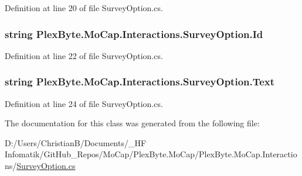 Definition at line 20 of file Survey\+Option.\+cs.

\subsubsection[{\texorpdfstring{Id}{Id}}]{\setlength{\rightskip}{0pt plus 5cm}string Plex\+Byte.\+Mo\+Cap.\+Interactions.\+Survey\+Option.\+Id\hspace{0.3cm}{\ttfamily [get]}}\hypertarget{class_plex_byte_1_1_mo_cap_1_1_interactions_1_1_survey_option_a9da80b0469096482b36fcfd126063d13}{}\label{class_plex_byte_1_1_mo_cap_1_1_interactions_1_1_survey_option_a9da80b0469096482b36fcfd126063d13}


Definition at line 22 of file Survey\+Option.\+cs.

\subsubsection[{\texorpdfstring{Text}{Text}}]{\setlength{\rightskip}{0pt plus 5cm}string Plex\+Byte.\+Mo\+Cap.\+Interactions.\+Survey\+Option.\+Text\hspace{0.3cm}{\ttfamily [get]}}\hypertarget{class_plex_byte_1_1_mo_cap_1_1_interactions_1_1_survey_option_a87cdd508f7cd9c80828c420486202bca}{}\label{class_plex_byte_1_1_mo_cap_1_1_interactions_1_1_survey_option_a87cdd508f7cd9c80828c420486202bca}


Definition at line 24 of file Survey\+Option.\+cs.



The documentation for this class was generated from the following file\+:\begin{DoxyCompactItemize}
\item 
D\+:/\+Users/\+Christian\+B/\+Documents/\+\_\+\+H\+F Infomatik/\+Git\+Hub\+\_\+\+Repos/\+Mo\+Cap/\+Plex\+Byte.\+Mo\+Cap/\+Plex\+Byte.\+Mo\+Cap.\+Interactions/\hyperlink{_survey_option_8cs}{Survey\+Option.\+cs}\end{DoxyCompactItemize}

